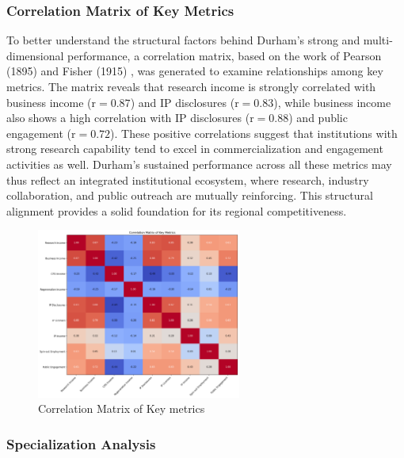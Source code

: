 \documentclass[journal,onecolumn, 10pt,draftclsnofoot]{IEEEtran}
\begin{document}
\subsubsection{Correlation Matrix of Key Metrics}

To better understand the structural factors behind Durham's strong and multi-dimensional performance, a correlation matrix, based on the work of Pearson (1895) \cite{pearson1895notes} and Fisher (1915) \cite{fisher1915frequency}, was generated to examine relationships among key metrics. The matrix reveals that research income is strongly correlated with business income ($\mathrm{r}=0.87$) and IP disclosures ($\mathrm{r}=0.83$), while business income also shows a high correlation with IP disclosures ($\mathrm{r}=0.88$) and public engagement ($\mathrm{r}=0.72$). These positive correlations suggest that institutions with strong research capability tend to excel in commercialization and engagement activities as well. Durham's sustained performance across all these metrics may thus reflect an integrated institutional ecosystem, where research, industry collaboration, and public outreach are mutually reinforcing. This structural alignment provides a solid foundation for its regional competitiveness.



\begin{figure}[h]
\centering
\includegraphics[width=0.6\textwidth]{Fig/figure36.correlation_matrix.png}
\caption{Correlation Matrix of Key metrics}
\label{fig:correlation-matrix}
\end{figure}

\subsubsection{Specialization Analysis}
\end{document}
